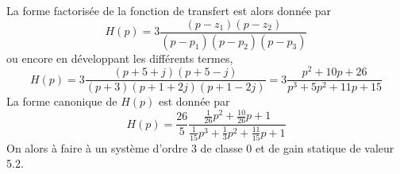 \question{}
La forme factorisée de la fonction de transfert est alors donnée par 
\[
    H(p)=3\dfrac{(p-z_1)(p-z_2)}{(p-p_1)(p-p_2)(p-p_3)}
\]
ou encore en développant les différents termes,
\[
    H(p)=3\dfrac{(p+5+j)(p+5-j)}{(p+3)(p+1+2j)(p+1-2j)}
        =3\dfrac{p^2+10p+26}{p^3+5p^2+11p+15}
\]
\question{}
La forme canonique de $H(p)$ est donnée par 
\[
    H(p)=\dfrac{26}{5}\dfrac{\frac{1}{26}p^2+\frac{10}{26}p+1}
                            {\frac{1}{15}p^3+\frac{1}{3}p^2+\frac{11}{15}p+1}
\]
On alors à faire à un système d'ordre 3 de classe 0 et de gain statique 
de valeur 5.2. 



